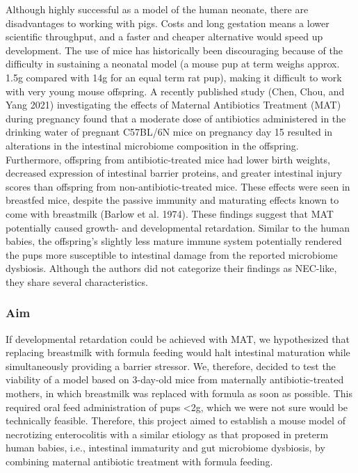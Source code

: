 \documentclass[
]{article}
\begin{document}
Although highly successful as a model of the human neonate, there are disadvantages to working with pigs. Costs and long gestation means a lower scientific throughput, and a faster and cheaper alternative would speed up development. The use of mice has historically been discouraging because of the difficulty in sustaining a neonatal model (a mouse pup at term weighs approx. 1.5g compared with 14g for an equal term rat pup), making it difficult to work with very young mouse offspring. A recently published study (Chen, Chou, and Yang 2021) investigating the effects of Maternal Antibiotics Treatment (MAT) during pregnancy found that a moderate dose of antibiotics administered in the drinking water of pregnant C57BL/6N mice on pregnancy day 15 resulted in alterations in the intestinal microbiome composition in the offspring. Furthermore, offspring from antibiotic-treated mice had lower birth weights, decreased expression of intestinal barrier proteins, and greater intestinal injury scores than offspring from non-antibiotic-treated mice. These effects were seen in breastfed mice, despite the passive immunity and maturating effects known to come with breastmilk (Barlow et al. 1974). These findings suggest that MAT potentially caused growth- and developmental retardation. Similar to the human babies, the offspring's slightly less mature immune system potentially rendered the pups more susceptible to intestinal damage from the reported microbiome dysbiosis. Although the authors did not categorize their findings as NEC-like, they share several characteristics.

\hypertarget{aim}{%
\subsubsection{Aim}\label{aim}}

If developmental retardation could be achieved with MAT, we hypothesized that replacing breastmilk with formula feeding would halt intestinal maturation while simultaneously providing a barrier stressor. We, therefore, decided to test the viability of a model based on 3-day-old mice from maternally antibiotic-treated mothers, in which breastmilk was replaced with formula as soon as possible. This required oral feed administration of pups \textless2g, which we were not sure would be technically feasible. Therefore, this project aimed to establish a mouse model of necrotizing enterocolitis with a similar etiology as that proposed in preterm human babies, i.e., intestinal immaturity and gut microbiome dysbiosis, by combining maternal antibiotic treatment with formula feeding.
\newpage
\end{document}
